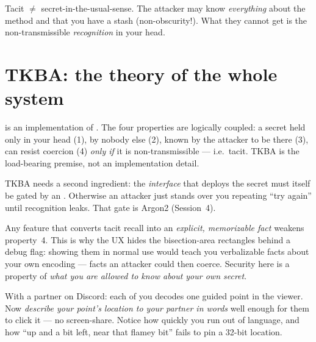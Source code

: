 \documentclass[a4paper,11pt]{report}
\begin{document}
\begin{pitfall}
Tacit $\neq$ secret-in-the-usual-sense. The attacker may know \emph{everything}
about the method and that you have a stash (non-obscurity!). What they cannot get
is the non-transmissible \emph{recognition} in your head.
\end{pitfall}

\section{TKBA: the theory of the whole system}
\GW{} is an implementation of . The four properties are logically coupled: a secret held only in your
head (1), by nobody else (2), known by the attacker to be there (3), can resist
coercion (4) \emph{only if} it is non-transmissible — i.e.\ tacit. TKBA is the
load-bearing premise, not an implementation detail.

TKBA needs a second ingredient: the \emph{interface} that deploys the secret must
itself be gated by an . Otherwise an
attacker just stands over you repeating ``try again'' until recognition leaks.
That gate is Argon2 (Session~4).

\begin{deeper}
Any feature that converts tacit recall into an \emph{explicit, memorizable fact}
weakens property~4. This is why the UX hides the bisection-area rectangles behind
a debug flag: showing them in normal use would teach you verbalizable facts about
your own encoding — facts an attacker could then coerce. Security here is a
property of \emph{what you are allowed to know about your own secret}.
\end{deeper}


\begin{tryit}
With a partner on Discord: each of you decodes one guided point in the viewer.
Now \emph{describe your point's location to your partner in words} well enough for
them to click it — no screen-share. Notice how quickly you run out of language,
and how ``up and a bit left, near that flamey bit'' fails to pin a 32-bit
location.
\end{tryit}

\end{document}
